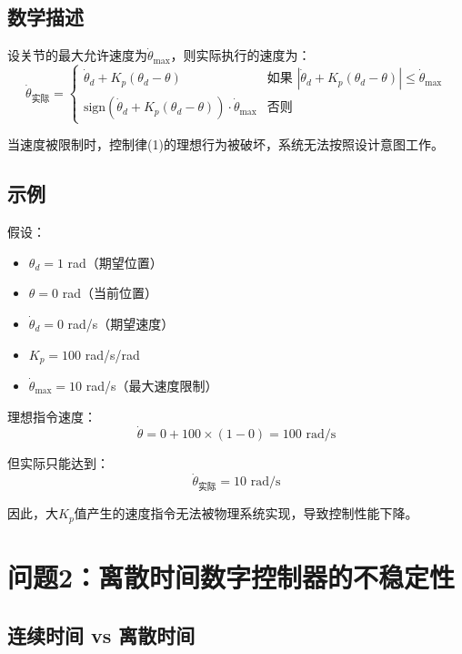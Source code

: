 \documentclass[12pt,a4paper]{article}
\begin{document}
\subsection{数学描述}

设关节的最大允许速度为$\dot{\theta}_{\max}$，则实际执行的速度为：
\begin{equation}
\dot{\theta}_{\text{实际}} = \begin{cases}
\dot{\theta}_d + K_p(\theta_d - \theta) & \text{如果 } |\dot{\theta}_d + K_p(\theta_d - \theta)| \leq \dot{\theta}_{\max} \\
\text{sign}(\dot{\theta}_d + K_p(\theta_d - \theta)) \cdot \dot{\theta}_{\max} & \text{否则}
\end{cases}
\end{equation}

当速度被限制时，控制律(1)的理想行为被破坏，系统无法按照设计意图工作。

\subsection{示例}

假设：
\begin{itemize}
\item $\theta_d = 1$ rad（期望位置）
\item $\theta = 0$ rad（当前位置）
\item $\dot{\theta}_d = 0$ rad/s（期望速度）
\item $K_p = 100$ rad/s/rad
\item $\dot{\theta}_{\max} = 10$ rad/s（最大速度限制）
\end{itemize}

理想指令速度：
\begin{equation}
\dot{\theta} = 0 + 100 \times (1 - 0) = 100 \text{ rad/s}
\end{equation}

但实际只能达到：
\begin{equation}
\dot{\theta}_{\text{实际}} = 10 \text{ rad/s}
\end{equation}

因此，大$K_p$值产生的速度指令无法被物理系统实现，导致控制性能下降。

\section{问题2：离散时间数字控制器的不稳定性}

\subsection{连续时间 vs 离散时间}
\end{document}
